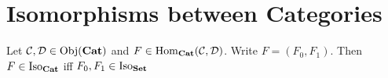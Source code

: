 \documentclass{book}
\begin{document}
	
	
	
	
	
	
	
	
	
	
	
	
	
	
	
	
	
	
	
	
	
	
	
	
	
	\section{Isomorphisms between Categories}
	
	\begin{ex}
		Let $\MC, \MD \in \Obj(\bCat)$ and $F \in \Hom_{\bCat}(\MC, \MD)$. Write $F = (F_0, F_1)$. Then $F \in \Iso_{\bCat}$ iff $F_0, F_1 \in \Iso_{\bSet}$
	\end{ex}
	
\end{document}
